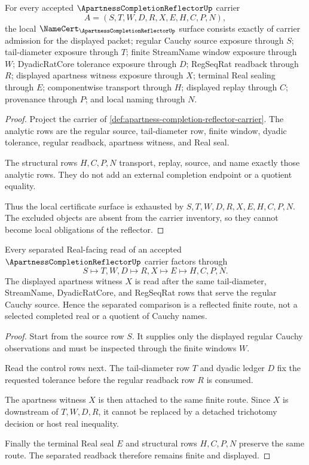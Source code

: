 \begin{theorem}
\label{thm:apartness-completion-reflector-carrier-obligation}
For every accepted $\ApartnessCompletionReflectorUp$ carrier
$$
A=(S,T,W,D,R,X,E,H,C,P,N),
$$
the local $\NameCert_{\ApartnessCompletionReflectorUp}$ surface consists exactly of carrier admission for the displayed packet; regular Cauchy source exposure through $S$; tail-diameter exposure through $T$; finite StreamName window exposure through $W$; DyadicRatCore tolerance exposure through $D$; RegSeqRat readback through $R$; displayed apartness witness exposure through $X$; terminal Real sealing through $E$; componentwise transport through $H$; displayed replay through $C$; provenance through $P$; and local naming through $N$.
\end{theorem}
\begin{proof}
Project the carrier of \autoref{def:apartness-completion-reflector-carrier}. The analytic rows are the regular source, tail-diameter row, finite window, dyadic tolerance, regular readback, apartness witness, and Real seal.

The structural rows $H,C,P,N$ transport, replay, source, and name exactly those analytic rows. They do not add an external completion endpoint or a quotient equality.

Thus the local certificate surface is exhausted by $S,T,W,D,R,X,E,H,C,P,N$. The excluded objects are absent from the carrier inventory, so they cannot become local obligations of the reflector.
\end{proof}

\begin{theorem}
\label{thm:apartness-completion-reflector-separated-readback}
Every separated Real-facing read of an accepted $\ApartnessCompletionReflectorUp$ carrier factors through
$$
S \longmapsto T,W,D \longmapsto R,X \longmapsto E \longmapsto H,C,P,N .
$$
The displayed apartness witness $X$ is read after the same tail-diameter, StreamName, DyadicRatCore, and RegSeqRat rows that serve the regular Cauchy source. Hence the separated comparison is a reflected finite route, not a selected completed real or a quotient of Cauchy names.
\end{theorem}
\begin{proof}
Start from the source row $S$. It supplies only the displayed regular Cauchy observations and must be inspected through the finite windows $W$.

Read the control rows next. The tail-diameter row $T$ and dyadic ledger $D$ fix the requested tolerance before the regular readback row $R$ is consumed.

The apartness witness $X$ is then attached to the same finite route. Since $X$ is downstream of $T,W,D,R$, it cannot be replaced by a detached trichotomy decision or host real inequality.

Finally the terminal Real seal $E$ and structural rows $H,C,P,N$ preserve the same route. The separated readback therefore remains finite and displayed.
\end{proof}

